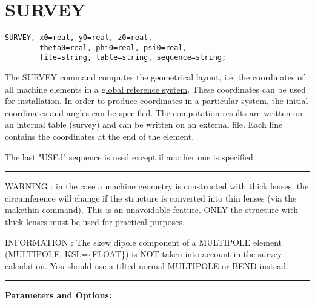  
\chapter{SURVEY}

\begin{verbatim}
SURVEY, x0=real, y0=real, z0=real, 
        theta0=real, phi0=real, psi0=real,
        file=string, table=string, sequence=string;
\end{verbatim}

The SURVEY command computes the geometrical layout, i.e. the coordinates
of all machine elements in a 
\href{../Introduction/conventions.html}{global reference system}. These
coordinates can be used for installation. In order to produce
coordinates in a particular system, the initial coordinates and angles
can be specified. The computation results are written on an internal
table (survey) and can be written on an external file. Each line
contains the coordinates at the end of the element. 

The last "USEd" sequence is used except if another one is specified.
\\
\hrule
WARNING : in the case a machine geometry is constructed with thick
lenses, the circumference will change if the structure is converted into
thin lenses (via the \href{../makethin/makethin.html}{makethin}
command). This is an unavoidable feature. ONLY the structure with thick
lenses must be used for practical purposes.

INFORMATION : The skew dipole component of a MULTIPOLE element
(MULTIPOLE, KSL=\{FLOAT\}) is NOT taken into account in the survey
calculation. You should use a tilted normal MULTIPOLE or BEND instead.
\\
\hrule

{\bf Parameters and Options:}


